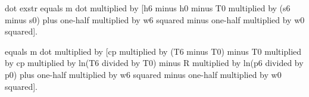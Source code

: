dot exstr equals m dot multiplied by [h6 minus h0 minus T0 multiplied by (s6 minus s0) plus one-half multiplied by w6 squared minus one-half multiplied by w0 squared].  

equals m dot multiplied by [cp multiplied by (T6 minus T0) minus T0 multiplied by cp multiplied by ln(T6 divided by T0) minus R multiplied by ln(p6 divided by p0) plus one-half multiplied by w6 squared minus one-half multiplied by w0 squared].